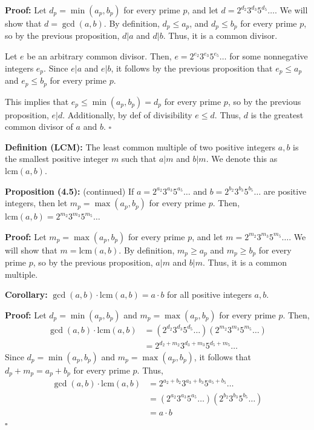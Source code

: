 \documentclass{article}
\newcommand*{\qed}{\hfill$\square$}%
\begin{document}
\textbf{Proof:} Let $d_p=\min(a_p,b_p)$ for every prime $p$, and let $d=2^{d_2}3^{d_3}5^{d_5}\dots$. We will show that $d=\gcd(a,b)$. By definition, $d_p\leq a_p$, and $d_p\leq b_p$ for every prime $p$, so by the previous proposition, $d|a$ and $d|b$. Thus, it is a common divisor. 

Let $e$ be an arbitrary common divisor. Then, $e=2^{e_2}3^{e_3}5^{e_5}\dots$ for some nonnegative integers $e_p$. Since $e|a$ and $e|b$, it follows by the previous proposition that $e_p\leq a_p$ and $e_p\leq b_p$ for every prime $p$. 

This implies that $e_p\leq \min(a_p,b_p)=d_p$ for every prime $p$, so by the previous proposition, $e|d$. Additionally, by def of divisibility $e\leq d$. Thus, $d$ is the greatest common divisor of $a$ and $b$. \qed

\newcommand*{\lcm}{\mathrm{lcm}}

\textbf{Definition (LCM):} The least common multiple of two positive integers $a,b$ is the smallest positive integer $m$ such that $a|m$ and $b|m$. We denote this as $\lcm(a,b)$.

\textbf{Proposition (4.5):} (continued) If $a=2^{a_2}3^{a_3}5^{a_5}\dots$ and $b=2^{b_2}3^{b_3}5^{b_5}\dots$ are positive integers, then let $m_p=\max(a_p,b_p)$ for every prime $p$. Then, $\lcm(a,b)=2^{m_2}3^{m_3}5^{m_5}\dots$

\textbf{Proof:} Let $m_p=\max(a_p,b_p)$ for every prime $p$, and let $m=2^{m_2}3^{m_3}5^{m_5}\dots$. We will show that $m=\lcm(a,b)$. By definition, $m_p\geq a_p$ and $m_p\geq b_p$ for every prime $p$, so by the previous proposition, $a|m$ and $b|m$. Thus, it is a common multiple.

\textbf{Corollary:} $\gcd(a,b)\cdot \lcm(a,b) = a\cdot b$ for all positive integers $a,b$.

\textbf{Proof:} Let $d_p=\min(a_p,b_p)$ and $m_p=\max(a_p,b_p)$ for every prime $p$. Then, \begin{align*}
    \gcd(a,b)\cdot \lcm(a,b) &= (2^{d_2}3^{d_3}5^{d_5}\dots)(2^{m_2}3^{m_3}5^{m_5}\dots) \\
                              &= 2^{d_2+m_2}3^{d_3+m_3}5^{d_5+m_5}\dots
\end{align*}Since $d_p=\min(a_p,b_p)$ and $m_p=\max(a_p,b_p)$, it follows that $d_p+m_p=a_p+b_p$ for every prime $p$. Thus, \begin{align*}
    \gcd(a,b)\cdot \lcm(a,b) &= 2^{a_2+b_2}3^{a_3+b_3}5^{a_5+b_5}\dots \\
                              &= (2^{a_2}3^{a_3}5^{a_5}\dots)(2^{b_2}3^{b_3}5^{b_5}\dots) \\
                              &= a\cdot b
\end{align*}\qed
\end{document}
